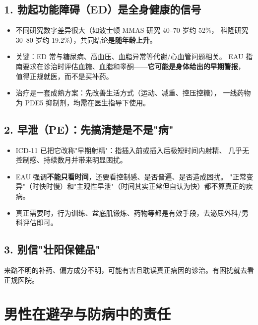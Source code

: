 \subsection*{1. 勃起功能障碍（ED）是全身健康的信号}

\begin{itemize}[leftmargin=2em]
  \item 不同研究数字差异很大（如波士顿 MMAS 研究 40--70 岁约 52\%，
        科隆研究 30--80 岁约 19.2\%），共同结论是\textbf{随年龄上升}。
  \item 关键：ED 常与糖尿病、高血压、血脂异常等代谢/心血管问题相关。
        EAU 指南要求在诊治时评估血糖、血脂和睾酮——\textbf{它可能是身体给出的早期警报}，
        值得正规就医，而不是买补药。
  \item 治疗是一套成熟方案：先改善生活方式（运动、减重、控压控糖），
        一线药物为 PDE5 抑制剂，均需在医生指导下使用。
\end{itemize}

\subsection*{2. 早泄（PE）：先搞清楚是不是"病"}

\begin{itemize}[leftmargin=2em]
  \item ICD-11 已把它改称"早期射精"：指插入前或插入后极短时间内射精、
        几乎无控制感、持续数月并带来明显困扰。
  \item EAU 强调\textbf{不能只看时间}，还要看控制感、是否普遍、是否造成困扰。
        "正常变异"（时快时慢）和"主观性早泄"（时间其实正常但自认为快）都不算真正的疾病。
  \item 真正需要时，行为训练、盆底肌锻炼、药物等都是有效手段，去泌尿外科/男科评估即可。
\end{itemize}

\subsection*{3. 别信"壮阳保健品"}

来路不明的补药、偏方成分不明，可能有害且耽误真正病因的诊治。有困扰就去看正规医院。

\section{男性在避孕与防病中的责任}

